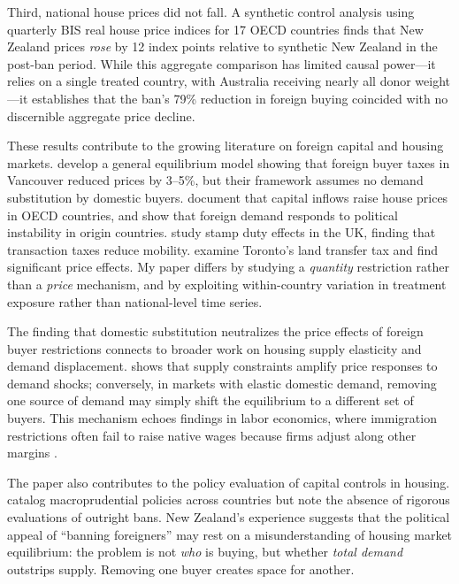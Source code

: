 \documentclass[12pt]{article}
\begin{document}
Third, national house prices did not fall. A synthetic control analysis using quarterly BIS real house price indices for 17 OECD countries finds that New Zealand prices \emph{rose} by 12 index points relative to synthetic New Zealand in the post-ban period. While this aggregate comparison has limited causal power---it relies on a single treated country, with Australia receiving nearly all donor weight---it establishes that the ban's 79\% reduction in foreign buying coincided with no discernible aggregate price decline.

These results contribute to the growing literature on foreign capital and housing markets. \citet{favilukis2021housing} develop a general equilibrium model showing that foreign buyer taxes in Vancouver reduced prices by 3--5\%, but their framework assumes no demand substitution by domestic buyers. \citet{sa2016effect} document that capital inflows raise house prices in OECD countries, and \citet{badarinza2019foreigners} show that foreign demand responds to political instability in origin countries. \citet{best2022housing} study stamp duty effects in the UK, finding that transaction taxes reduce mobility. \citet{dachis2012role} examine Toronto's land transfer tax and find significant price effects. My paper differs by studying a \emph{quantity} restriction rather than a \emph{price} mechanism, and by exploiting within-country variation in treatment exposure rather than national-level time series.

The finding that domestic substitution neutralizes the price effects of foreign buyer restrictions connects to broader work on housing supply elasticity and demand displacement. \citet{saiz2010geographic} shows that supply constraints amplify price responses to demand shocks; conversely, in markets with elastic domestic demand, removing one source of demand may simply shift the equilibrium to a different set of buyers. This mechanism echoes findings in labor economics, where immigration restrictions often fail to raise native wages because firms adjust along other margins \citep{peri2012effect}.

The paper also contributes to the policy evaluation of capital controls in housing. \citet{cerutti2017housing} catalog macroprudential policies across countries but note the absence of rigorous evaluations of outright bans. New Zealand's experience suggests that the political appeal of ``banning foreigners'' may rest on a misunderstanding of housing market equilibrium: the problem is not \emph{who} is buying, but whether \emph{total demand} outstrips supply. Removing one buyer creates space for another.
\end{document}
